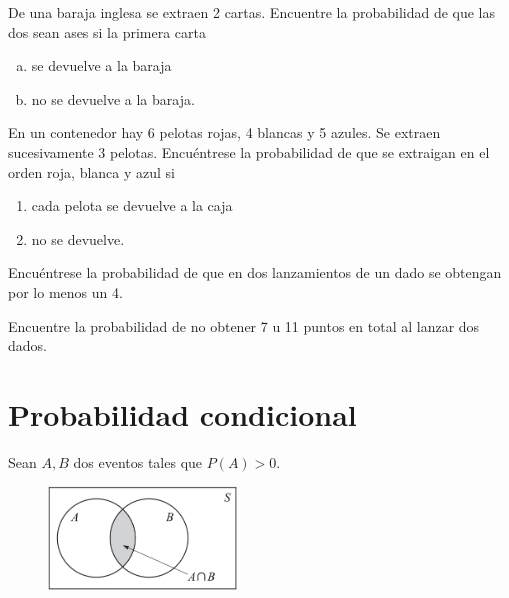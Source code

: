  
  \begin{problema}
   \label{solved:est.6.5}
   De una baraja inglesa se extraen 2 cartas. Encuentre la probabilidad de que las dos sean ases si la primera carta
   \begin{enumerate}[(a)]
    \item se devuelve a la baraja 
    \item no se devuelve a la baraja.
   \end{enumerate}

  \end{problema}

 
 
  \begin{problema}
   \label{solved:est.6.6}
   En un contenedor hay 6 pelotas rojas, 4 blancas y 5 azules. Se extraen sucesivamente 3 pelotas. Encuéntrese la probabilidad de que se extraigan en el orden roja, blanca y azul si
   \begin{enumerate}
    \item cada pelota se devuelve a la caja 
    \item no se devuelve.
   \end{enumerate}

  \end{problema}

 
 
  \begin{problema}
   \label{solved:est.6.7}
   Encuéntrese la probabilidad de que en dos lanzamientos de un dado se obtengan por lo menos un 4.
  \end{problema}

 
 
  \begin{problema}
   \label{solved:1.9}
   Encuentre la probabilidad de no obtener 7 u 11 puntos en total al lanzar dos dados.
  \end{problema}

 

 \section{Probabilidad condicional}
{}
Sean $A,B$ dos eventos tales que $P(A)>0.$
\begin{figure}
 \centering
 \includegraphics[width=5cm,keepaspectratio=true]{./pe/pands0103.png}
 \label{pands0103}
\end{figure}

